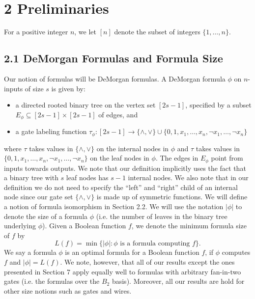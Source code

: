 \section*{2 Preliminaries}
For a positive integer $n$, we let $[n]$ denote the subset of integers $\{1,\ldots,n\}$.
\subsection*{2.1 DeMorgan Formulas and Formula Size}
Our notion of formulas will be DeMorgan formulas. A DeMorgan formula $\phi$ on $n$-inputs of size $s$ is given by:
\begin{itemize}
\item a directed rooted binary tree on the vertex set $[2s-1]$, specified by a subset $E_\phi\subseteq[2s-1]\times[2s-1]$ of edges, and
\item a gate labeling function $\tau_\phi:[2s-1]\to\{\land,\lor\}\cup\{0,1,x_1,\ldots,x_n,\neg x_1,\ldots,\neg x_n\}$
\end{itemize}
where $\tau$ takes values in $\{\land,\lor\}$ on the internal nodes in $\phi$ and $\tau$ takes values in $\{0,1,x_1,\ldots,x_n,\neg x_1,\ldots,\neg x_n\}$ on the leaf nodes in $\phi$. The edges in $E_\phi$ point from inputs towards outputs. We note that our definition implicitly uses the fact that a binary tree with $s$ leaf nodes has $s-1$ internal nodes. We also note that in our definition we do not need to specify the ``left'' and ``right'' child of an internal node since our gate set $\{\land,\lor\}$ is made up of symmetric functions. We will define a notion of formula isomorphism in Section 2.2.
We will use the notation $|\phi|$ to denote the size of a formula $\phi$ (i.e. the number of leaves in the binary tree underlying $\phi$). Given a Boolean function $f$, we denote the minimum formula size of $f$ by
\[L(f)=\min\{|\phi|:\phi\text{ is a formula computing }f\}.\]
We say a formula $\phi$ is an optimal formula for a Boolean function $f$, if $\phi$ computes $f$ and $|\phi|=L(f)$.
We note, however, that all of our results except the ones presented in Section 7 apply equally well to formulas with arbitrary fan-in-two gates (i.e. the formulas over the $B_2$ basis). Moreover, all our results are hold for other size notions such as gates and wires.
